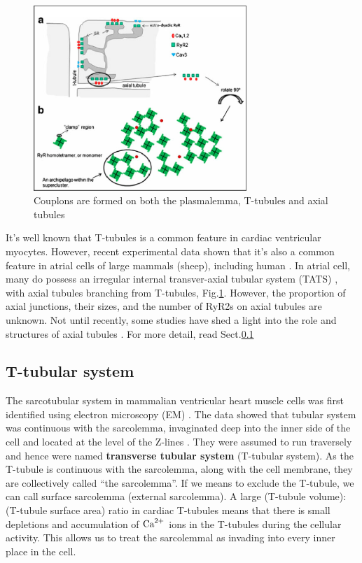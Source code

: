 \begin{figure}[hbt]
  \centerline{\includegraphics[height=7cm,
    angle=0]{./images/couplon_axial.eps}}
\caption{Couplons are formed on both the plasmalemma, T-tubules and axial
tubules \citep{asghari2009}}
\label{fig:couplon_axials}
\end{figure}

It's well known that T-tubules is a common feature in cardiac ventricular
myocytes. However, recent experimental data shown that it's also a common
feature in atrial cells of large mammals (sheep), including human
\citep{kirk2003, richards2011}. In atrial cell, many do possess an irregular
internal transver-axial tubular system (TATS) \citep{kirk2003}, with axial tubules
branching from T-tubules, Fig.\ref{fig:couplon_axials}. However, the proportion
of  axial junctions, their sizes, and the number of RyR2s on axial tubules are
unknown. Not until recently, some studies have shed a light into the role and
structures of axial tubules
\citep{asghari2009}. For more detail, read Sect.\ref{sec:t-tubular_system}



\subsection{T-tubular system}
\label{sec:t-tubular_system}

The sarcotubular system in mammalian ventricular heart muscle cells was first
identified using electron microscopy (EM) \citep{lindner1956}. The data showed
that tubular system was continuous with the sarcolemma, invaginated deep into
the inner side of the cell and located at the level of the Z-lines
\citep{girardier1964}.
They were assumed to run traversely and hence were named {\bf transverse tubular
system} (T-tubular system). As the T-tubule is continuous with the sarcolemma,
along with the cell membrane, they are collectively called ``the sarcolemma''.
If we means to exclude the T-tubule, we can call surface sarcolemma (external
sarcolemma). A large (T-tubule volume):(T-tubule surface area) ratio in cardiac
T-tubules means that there is small depletions and accumulation of ${\text{Ca}^{2+}}$ ions in
the T-tubules during the cellular activity. This allows us to treat the
sarcolemmal as invading into every inner place in the cell.


